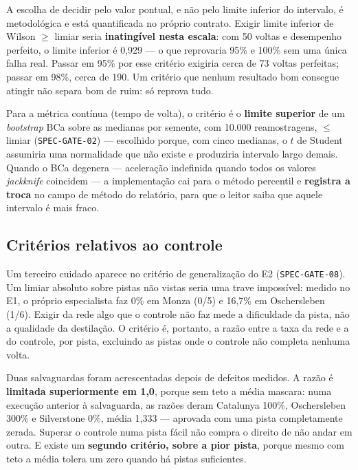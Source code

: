A escolha de decidir pelo valor pontual, e não pelo limite inferior do intervalo,
é metodológica e está quantificada no próprio contrato. Exigir limite inferior de
Wilson $\geq$ limiar seria \textbf{inatingível nesta escala}: com 50 voltas e
desempenho perfeito, o limite inferior é 0,929 --- o que reprovaria 95\% e 100\%
sem uma única falha real. Passar em 95\% por esse critério exigiria cerca de 73
voltas perfeitas; passar em 98\%, cerca de 190. Um critério que nenhum resultado
bom consegue atingir não separa bom de ruim: só reprova tudo.

Para a métrica contínua (tempo de volta), o critério é o \textbf{limite superior}
de um \textit{bootstrap} BCa sobre as medianas por semente, com 10.000
reamostragens, $\leq$ limiar (\texttt{SPEC-GATE-02}) --- escolhido porque, com
cinco medianas, o $t$ de Student assumiria uma normalidade que não existe e
produziria intervalo largo demais. Quando o BCa degenera ---
aceleração indefinida quando todos os valores \textit{jackknife} coincidem --- a
implementação cai para o método percentil e \textbf{registra a troca} no campo de
método do relatório, para que o leitor saiba que aquele intervalo é mais fraco.

\subsection{Critérios relativos ao controle}\label{sec:val-relativo}

Um terceiro cuidado aparece no critério de generalização do E2
(\texttt{SPEC-GATE-08}). Um limiar absoluto sobre pistas não vistas seria uma
trave impossível: medido no E1, o próprio especialista faz 0\% em Monza (0/5) e
16,7\% em Oschersleben (1/6). Exigir da rede algo que o controle não faz mede a dificuldade da
pista, não a qualidade da destilação. O critério é, portanto, a razão entre a
taxa da rede e a do controle, por pista, excluindo as pistas onde o controle não
completa nenhuma volta.

Duas salvaguardas foram acrescentadas depois de defeitos medidos. A razão é
\textbf{limitada superiormente em 1,0}, porque sem teto a média mascara: numa
execução anterior à salvaguarda, as razões deram Catalunya 100\%, Oschersleben
300\% e Silverstone 0\%, média 1,333 --- aprovada com uma pista completamente
zerada. Superar o controle numa pista fácil não compra o direito de não andar em
outra. E existe um \textbf{segundo critério, sobre a pior pista}, porque mesmo
com teto a média tolera um zero quando há pistas suficientes.

